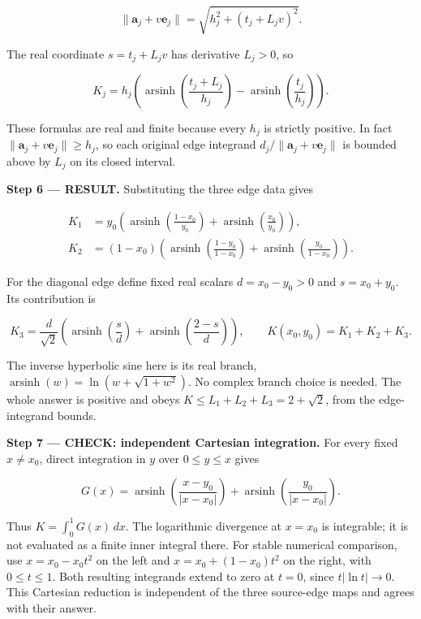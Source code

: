 \documentclass[11pt,oneside,openany]{book}
\begin{document}
\[
\|\mathbf a_j+v\mathbf e_j\|
=\sqrt{h_j^2+(t_j+L_jv)^2}.
\]

The real coordinate \(s=t_j+L_jv\) has derivative \(L_j>0\), so

\[
K_j=h_j\left(
\operatorname{arsinh}\left(\frac{t_j+L_j}{h_j}\right)
-\operatorname{arsinh}\left(\frac{t_j}{h_j}\right)\right).
\]

These formulas are real and finite because every \(h_j\) is strictly positive. In fact \(\|\mathbf a_j+v\mathbf e_j\|\ge h_j\), so each original edge integrand \(d_j/\|\mathbf a_j+v\mathbf e_j\|\) is bounded above by \(L_j\) on its closed interval.

\textbf{Step 6 --- RESULT.} Substituting the three edge data gives

\[
\begin{aligned}
K_1&=y_0\left(\operatorname{arsinh}\left(\frac{1-x_0}{y_0}\right)
+\operatorname{arsinh}\left(\frac{x_0}{y_0}\right)\right),\\
K_2&=(1-x_0)\left(\operatorname{arsinh}\left(\frac{1-y_0}{1-x_0}\right)
+\operatorname{arsinh}\left(\frac{y_0}{1-x_0}\right)\right).
\end{aligned}
\]

For the diagonal edge define fixed real scalars \(d=x_0-y_0>0\) and \(s=x_0+y_0\). Its contribution is

\[
K_3=\frac d{\sqrt2}\left(\operatorname{arsinh}\left(\frac{s}{d}\right)
+\operatorname{arsinh}\left(\frac{2-s}{d}\right)\right),
\qquad K(x_0,y_0)=K_1+K_2+K_3.
\]

The inverse hyperbolic sine here is its real branch, \(\operatorname{arsinh}(w)=\ln(w+\sqrt{1+w^2})\). No complex branch choice is needed. The whole answer is positive and obeys \(K\le L_1+L_2+L_3=2+\sqrt2\), from the edge-integrand bounds.

\textbf{Step 7 --- CHECK: independent Cartesian integration.} For every fixed \(x\ne x_0\), direct integration in \(y\) over \(0\le y\le x\) gives

\[
G(x)=\operatorname{arsinh}\left(\frac{x-y_0}{|x-x_0|}\right)
+\operatorname{arsinh}\left(\frac{y_0}{|x-x_0|}\right).
\]

Thus \(K=\int_0^1G(x)\,dx\). The logarithmic divergence at \(x=x_0\) is integrable; it is not evaluated as a finite inner integral there. For stable numerical comparison, use \(x=x_0-x_0t^2\) on the left and \(x=x_0+(1-x_0)t^2\) on the right, with \(0\le t\le1\). Both resulting integrands extend to zero at \(t=0\), since \(t|\ln t|\to0\). This Cartesian reduction is independent of the three source-edge maps and agrees with their answer.
\end{document}
